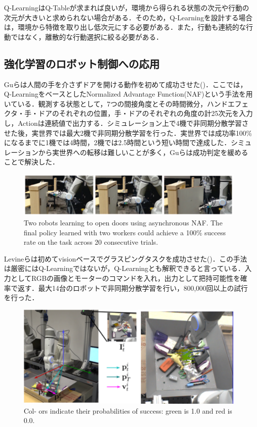 Q-LearningはQ-Tableが求まれば良いが，環境から得られる状態の次元や行動の次元が大きいと求められない場合がある．そのため，Q-Learningを設計する場合は，環境から特徴を取り出し低次元にする必要がある．また，行動も連続的な行動ではなく，離散的な行動選択に絞る必要がある．


\subsection{強化学習のロボット制御への応用}
Guらは人間の手を介さずドアを開ける動作を初めて成功させた\cite{Gu2017}()．ここでは，Q-LearningをベースとしたNormalized Advantage Function(NAF)という手法を用いている．観測する状態として，7つの間接角度とその時間微分，ハンドエフェクタ・手・ドアのそれぞれの位置，手・ドアのそれぞれの角度の計25次元を入力し，Actionは連続値で出力する．シミュレーション上で4機で非同期分散学習させた後，実世界では最大2機で非同期分散学習を行った．実世界では成功率100\%になるまでに1機では4時間，2機では2.5時間という短い時間で達成した．シミュレーションから実世界への転移は難しいことが多く，Guらは成功判定を緩めることで解決した．
\begin{figure}
    \centering
    \includegraphics[width=\linewidth]{figure/Introduction/Gu}
    \caption{Two robots learning to open doors using asynchronous NAF. The final policy learned with two workers could achieve a 100\% success rate on the task across 20 consecutive trials\cite{Gu2017}.}
    \label{fig:Gu}
\end{figure}

Levineらは初めてvisionベースでグラスピングタスクを成功させた\cite{Levine2017}()．この手法は厳密にはQ-Learningではないが，Q-Learningとも解釈できると言っている．入力としてRGBの画像とモーターのコマンドを入れ，出力として把持可能性を確率で返す．最大14台のロボットで非同期分散学習を行い，800,000回以上の試行を行った．
\begin{figure}
    \centering
    \includegraphics[width=\linewidth]{figure/Introduction/Levine_grasp}
    \caption{Col- ors indicate their probabilities of success: green is 1.0 and red is 0.0\cite{Levine2017}.}
    \label{fig:Levine}
\end{figure}

